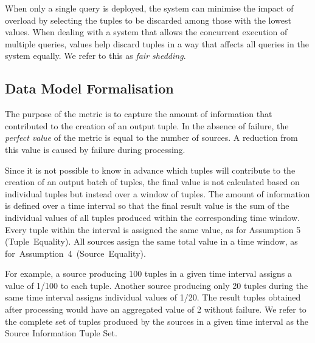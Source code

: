 When only a single query is deployed, the system can minimise the impact of overload by selecting the
tuples to be discarded among those with the lowest \sic values.
When dealing with a system that allows the concurrent execution of multiple queries, \sic values
help discard tuples in a way that affects all queries in the system equally.
We refer to this as \textit{fair shedding}. 

\subsection*{Data Model Formalisation} 
\label{sec:sits}
The purpose of the \sic metric is to capture the amount of information that contributed to the creation
of an output tuple. In the absence of failure, the \emph{perfect value} of the \sic metric is equal to
the number of sources. A reduction from this value is caused by failure during processing. 

Since it is not possible to know in advance which tuples will contribute to the creation of an output
batch of tuples, the final \sic value is not calculated based on individual tuples but instead over a
window of tuples. The amount of information is defined over a time interval so that the final result \sic value
is the sum of the individual \sic values of all tuples produced within the corresponding time window.
Every tuple within the interval is assigned the same value, as for Assumption 5 (Tuple~Equality). All
sources assign the same total \sic value in a time window, as for~Assumption~4~(Source~Equality).

For example, a source producing 100 tuples in a given time interval
assigns a \sic value of 1/100 to each tuple. Another source producing only 20 tuples during the same
time interval assigns individual \sic values of 1/20. The result tuples obtained after processing
would have an aggregated \sic value of 2 without failure.
We refer to the complete set of tuples produced by the sources in a given time interval as the
Source Information Tuple Set.

